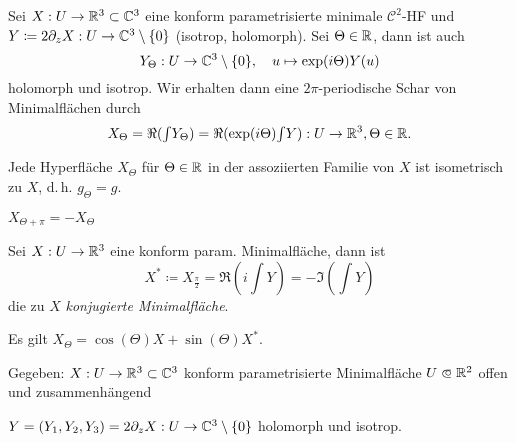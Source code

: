 \documentclass{cheat-sheet}
\begin{document}



\begin{defn}
  Sei $X : U \to \mathbb{R}^3 \subset \mathbb{C}^3$ eine konform parametrisierte minimale $\mathcal{C}^2$-HF und $Y \coloneqq 2 \partial_z X : U \to \mathbb{C}^3 \setminus \{ 0 \}$ (isotrop, holomorph). Sei $\Theta \in \mathbb{R}$, dann ist auch
  \[ Y_\Theta : U \to \mathbb{C}^3 \setminus \{ 0 \}, \quad u \mapsto \exp(i \Theta) Y(u) \]
  holomorph und isotrop. Wir erhalten dann eine $2 \pi$-periodische Schar von Minimalflächen durch
  \[ X_{\Theta} = \Re ({\textstyle \int} Y_{\Theta}) = \Re (\exp(i \Theta) {\textstyle \int} Y) : U \to \mathbb{R}^3, \Theta \in \mathbb{R}. \]
\end{defn}

\begin{lem}
  Jede Hyperfläche $X_\Theta$ für $\Theta \in \mathbb{R}$ in der assoziierten Familie von $X$ ist isometrisch zu $X$, d.\,h. $g_{\Theta} = g$.
\end{lem}

\begin{beob}
  $X_{\Theta + \pi} = - X_{\Theta}$
\end{beob}

\begin{defn}
  Sei $X : U \to \mathbb{R}^3$ eine konform param. Minimalfläche, dann ist
  \[ X^* \coloneqq X_{\tfrac{\pi}{2}} = \Re (i {\textstyle \int} Y) = - \Im ({\textstyle \int} Y) \]
  die zu $X$ \emph{konjugierte Minimalfläche}.
\end{defn}

\begin{beob}
  Es gilt $X_{\Theta} = \cos(\Theta) X + \sin(\Theta) X^*$.
\end{beob}


\iffalse
  Gegeben: $X : U \to \mathbb{R}^3 \subset \mathbb{C}^3$ konform parametrisierte Minimalfläche
  $U \opn \R^2$ offen und zusammenhängend

  $Y = (Y_1, Y_2, Y_3) = 2 \partial_z X : U \to \mathbb{C}^3 \setminus \{0\}$ holomorph und isotrop.
\end{document}
